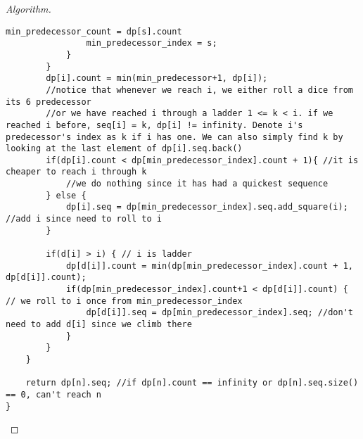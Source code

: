 \documentclass[openany]{article}
\begin{document}
\begin{proof}[Algorithm]{}
\begin{lstlisting}[basicstyle=\fontsize{8}{9}\selectfont\ttfamily]
                min_predecessor_count = dp[s].count
                min_predecessor_index = s;
            }
        }
        dp[i].count = min(min_predecessor+1, dp[i]);
        //notice that whenever we reach i, we either roll a dice from its 6 predecessor
        //or we have reached i through a ladder 1 <= k < i. if we reached i before, seq[i] = k, dp[i] != infinity. Denote i's predecessor's index as k if i has one. We can also simply find k by looking at the last element of dp[i].seq.back()
        if(dp[i].count < dp[min_predecessor_index].count + 1){ //it is cheaper to reach i through k
            //we do nothing since it has had a quickest sequence
        } else {
            dp[i].seq = dp[min_predecessor_index].seq.add_square(i); //add i since need to roll to i
        }
        
        if(d[i] > i) { // i is ladder
            dp[d[i]].count = min(dp[min_predecessor_index].count + 1, dp[d[i]].count);
            if(dp[min_predecessor_index].count+1 < dp[d[i]].count) { // we roll to i once from min_predecessor_index
                dp[d[i]].seq = dp[min_predecessor_index].seq; //don't need to add d[i] since we climb there
            }
        }
    }
    
    return dp[n].seq; //if dp[n].count == infinity or dp[n].seq.size() == 0, can't reach n
}
		\end{lstlisting} 
\end{proof}
\end{document}
